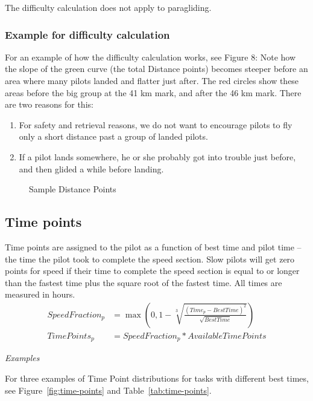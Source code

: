 \documentclass{article}
\begin{document}
\begin{pg}
The difficulty calculation does not apply to paragliding.
\end{pg}

\subsubsection{Example for difficulty calculation}
For an example of how the difficulty calculation works, see Figure 8: Note how
the slope of the green curve (the total Distance points) becomes steeper before
an area where many pilots landed and flatter just after. The red circles show
these areas before the big group at the 41 km mark, and after the 46 km mark.
There are two reasons for this:
\begin{enumerate}
    \item For safety and retrieval reasons, we do not want to encourage pilots to fly only a short distance past a group of landed pilots.
    \item If a pilot lands somewhere, he or she probably got into trouble just before, and then glided a while before landing.
\end{enumerate}

\begin{figure}[h]
    \centering
    
    \caption{Sample Distance Points}
\end{figure}

\subsection{Time points}
Time points are assigned to the pilot as a function of best time and pilot time
– the time the pilot took to complete the speed section. Slow pilots will get
zero points for speed if their time to complete the speed section is equal to
or longer than the fastest time plus the square root of the fastest time. All
times are measured in hours.
\begin{align*}
    SpeedFraction_p &= \max(0, 1 - \sqrt[3]{\frac{(Time_p - BestTime)^2}{\sqrt{BestTime}}}) \\
    TimePoints_p &= SpeedFraction_p * AvailableTimePoints
\end{align*}

\textit{Examples}

For three examples of Time Point distributions for tasks with different best
times, see Figure~\ref{fig:time-points} and Table~\ref{tab:time-points}.
\end{document}
